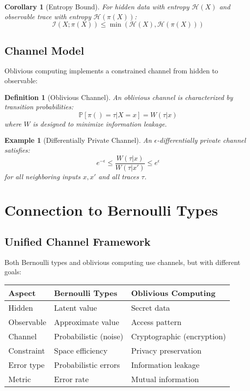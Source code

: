 \documentclass[11pt,final,hidelinks]{article}
\newtheorem{corollary}[theorem]{Corollary}
\newtheorem{definition}[theorem]{Definition}
\newtheorem{example}[theorem]{Example}
\newcommand{\Pattern}[1]{\pi(#1)}
\newcommand{\Entropy}[1]{\mathcal{H}(#1)}
\newcommand{\MutualInfo}[2]{\mathcal{I}(#1; #2)}
\newcommand{\Prob}[1]{\mathbb{P}\left[#1\right]}
\begin{document}
\begin{corollary}[Entropy Bound]
For hidden data with entropy $\Entropy{X}$ and observable trace with entropy $\Entropy{\Pattern{X}}$:
\begin{equation}
\MutualInfo{X}{\Pattern{X}} \leq \min(\Entropy{X}, \Entropy{\Pattern{X}})
\end{equation}
\end{corollary}

\subsection{Channel Model}

Oblivious computing implements a constrained channel from hidden to observable:

\begin{definition}[Oblivious Channel]
An oblivious channel is characterized by transition probabilities:
\begin{equation}
\Prob{\Pattern{} = \tau | X = x} = W(\tau|x)
\end{equation}
where $W$ is designed to minimize information leakage.
\end{definition}

\begin{example}[Differentially Private Channel]
An $\epsilon$-differentially private channel satisfies:
\begin{equation}
e^{-\epsilon} \leq \frac{W(\tau|x)}{W(\tau|x')} \leq e^{\epsilon}
\end{equation}
for all neighboring inputs $x, x'$ and all traces $\tau$.
\end{example}

\section{Connection to Bernoulli Types}

\subsection{Unified Channel Framework}

Both Bernoulli types and oblivious computing use channels, but with different goals:

\begin{center}
\begin{tabular}{lll}
\textbf{Aspect} & \textbf{Bernoulli Types} & \textbf{Oblivious Computing} \\
\hline
Hidden & Latent value & Secret data \\
Observable & Approximate value & Access pattern \\
Channel & Probabilistic (noise) & Cryptographic (encryption) \\
Constraint & Space efficiency & Privacy preservation \\
Error type & Probabilistic errors & Information leakage \\
Metric & Error rate & Mutual information \\
\end{tabular}
\end{center}
\end{document}
